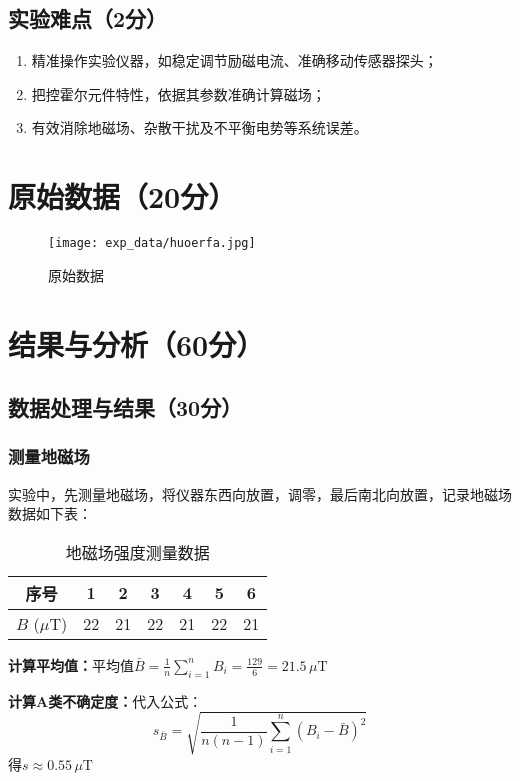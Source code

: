 \documentclass[]{../template/Report}%
\begin{document}
\subsection{实验难点（2分）}
\begin{enumerate}
    \item 精准操作实验仪器，如稳定调节励磁电流、准确移动传感器探头；
    \item 把控霍尔元件特性，依据其参数准确计算磁场；
    \item 有效消除地磁场、杂散干扰及不平衡电势等系统误差。
\end{enumerate}
\clearpage
\begin{fullreportonly}
\section{原始数据（20分）}
\begin{figure}[!h]
    \begin{center}
        \texttt{[image: exp\_data/huoerfa.jpg]}
        \caption{原始数据}
    \end{center}
\end{figure}
\section{结果与分析（60分）}
\subsection{数据处理与结果（30分）}
\subsubsection{测量地磁场}
实验中，先测量地磁场，将仪器东西向放置，调零，最后南北向放置，记录地磁场数据如下表：
\begin{table}[htbp]
  \centering
  \caption{地磁场强度测量数据}
  \begin{tabular}{ccccccc}
    \toprule
    序号 & 1 & 2 & 3 & 4 & 5 & 6 \\
    \midrule
    $B$ ($\mu\text{T}$)   & 22 & 21 & 22 & 21 & 22 & 21 \\
    \bottomrule
  \end{tabular}
\end{table}

\textbf{计算平均值：}平均值$\bar{B} = \frac{1}{n} \sum_{i=1}^n B_i= \frac{129}{6} = 21.5 \, \mu\text{T}$

\vspace{2mm}
\textbf{计算A类不确定度：}代入公式：
\[
s_{\bar{B}} = \sqrt{\frac{1}{n(n-1)} \sum_{i=1}^n (B_i - \bar{B})^2}
\]
得$s \approx 0.55 \, \mu\text{T}$

\end{fullreportonly}
\end{document}

